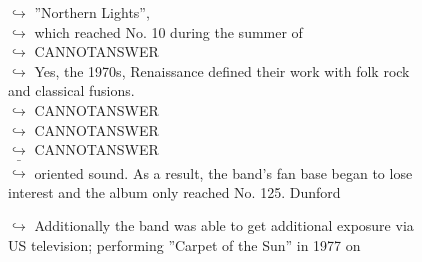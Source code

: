 \documentclass[11pt,a4paper, onecolumn]{article}
\begin{document}
\begin{figure}[t] \small \begin{tcolorbox}[boxsep=0pt,left=5pt,right=0pt,top=2pt,colback = yellow!5] \begin{dialogue}
 \small 
\colorbox{pink!25}{$\hookrightarrow$}
{ ''Northern Lights'', }
\\
\colorbox{pink!25}{$\hookrightarrow$}
{ which reached No. 10 during the summer of }
\\
\colorbox{pink!25}{$\hookrightarrow$}
{ CANNOTANSWER }
\\
\colorbox{pink!25}{$\hookrightarrow$}
\colorbox{red!25}{Yes,}
{ the 1970s, Renaissance defined their work with folk rock and classical fusions. }
\\
\colorbox{pink!25}{$\hookrightarrow$}
{ CANNOTANSWER }
\\
\colorbox{pink!25}{$\hookrightarrow$}
{ CANNOTANSWER }
\\
\colorbox{pink!25}{$\hookrightarrow$}
{ CANNOTANSWER }
\\
\colorbox{pink!25}{ $\bar{\hookrightarrow}$}
{ oriented sound. As a result, the band's fan base began to lose interest and the album only reached No. 125. Dunford }
 \end{dialogue}\end{tcolorbox}\end{figure}\begin{figure}[t] \small \begin{tcolorbox}[boxsep=0pt,left=5pt,right=0pt,top=2pt,colback = yellow!5] \begin{dialogue}
 \small 
\colorbox{pink!25}{$\hookrightarrow$}
{ Additionally the band was able to get additional exposure via US television; performing ''Carpet of the Sun'' in 1977 on }
\\
 \end{dialogue}\end{tcolorbox}\end{figure}
\end{document}
